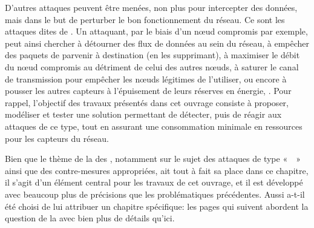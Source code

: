 D'autres attaques peuvent être menées, non plus pour intercepter des données, mais dans le but de perturber le bon fonctionnement du réseau.
Ce sont les attaques dites de \textit{\dds}.
Un attaquant, par le biais d'un nœud compromis par exemple, peut ainsi chercher à détourner des flux de données au sein du réseau, à empêcher des paquets de parvenir à destination (en les supprimant), à maximiser le débit du nœud compromis au détriment de celui des autres nœuds, à saturer le canal de transmission pour empêcher les nœuds légitimes de l'utiliser, ou encore à pousser les autres capteurs à l'épuisement de leurs réserves en énergie, \etc.
Pour rappel, l'objectif des travaux présentés dans cet ouvrage consiste à proposer, modéliser et tester une solution permettant de détecter, puis de réagir aux attaques de ce type, tout en assurant une consommation minimale en ressources pour les capteurs du réseau.

Bien que le thème de la \secu des \rcsfs, notamment sur le sujet des attaques de type « \dds » ainsi que des contre-mesures appropriées, ait tout à fait sa place dans ce chapitre, il s'agit d'un élément central pour les travaux de cet ouvrage, et il est développé avec beaucoup plus de précisions que les problématiques précédentes.
Aussi a-t-il été choisi de lui attribuer un chapitre spécifique: les pages qui suivent abordent la question de la \secu avec bien plus de détails qu'ici.
